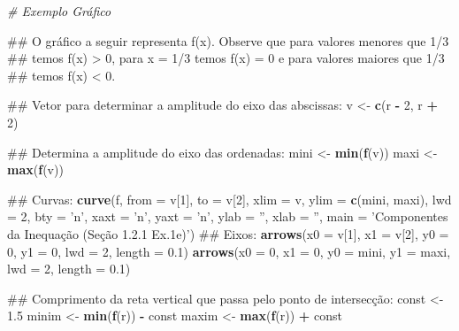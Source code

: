 \documentclass[]{book}
\newenvironment{Shaded}{\begin{snugshade}}{\end{snugshade}}
\newcommand{\KeywordTok}[1]{\textcolor[rgb]{0.13,0.29,0.53}{\textbf{#1}}}
\newcommand{\DataTypeTok}[1]{\textcolor[rgb]{0.13,0.29,0.53}{#1}}
\newcommand{\DecValTok}[1]{\textcolor[rgb]{0.00,0.00,0.81}{#1}}
\newcommand{\FloatTok}[1]{\textcolor[rgb]{0.00,0.00,0.81}{#1}}
\newcommand{\StringTok}[1]{\textcolor[rgb]{0.31,0.60,0.02}{#1}}
\newcommand{\CommentTok}[1]{\textcolor[rgb]{0.56,0.35,0.01}{\textit{#1}}}
\newcommand{\OperatorTok}[1]{\textcolor[rgb]{0.81,0.36,0.00}{\textbf{#1}}}
\newcommand{\NormalTok}[1]{#1}
\begin{document}
\begin{enumerate}
\begin{Shaded}
\begin{Highlighting}[]
\CommentTok{# Exemplo Gráfico}

\NormalTok{##  O gráfico a seguir representa f(x). Observe que para valores menores que 1/3}
\NormalTok{## temos f(x) > 0, para x = 1/3 temos f(x) = 0 e para valores maiores que 1/3}
\NormalTok{## temos f(x) < 0.}

\NormalTok{##  Vetor para determinar a amplitude do eixo das abscissas:}
\NormalTok{v <-}\StringTok{ }\KeywordTok{c}\NormalTok{(r }\OperatorTok{-}\StringTok{ }\DecValTok{2}\NormalTok{, r }\OperatorTok{+}\StringTok{ }\DecValTok{2}\NormalTok{)}

\NormalTok{##  Determina  a amplitude do eixo das ordenadas:}
\NormalTok{mini <-}\StringTok{ }\KeywordTok{min}\NormalTok{(}\KeywordTok{f}\NormalTok{(v))}
\NormalTok{maxi <-}\StringTok{ }\KeywordTok{max}\NormalTok{(}\KeywordTok{f}\NormalTok{(v))}

\NormalTok{##  Curvas:}
\KeywordTok{curve}\NormalTok{(f, }\DataTypeTok{from =}\NormalTok{ v[}\DecValTok{1}\NormalTok{], }\DataTypeTok{to =}\NormalTok{ v[}\DecValTok{2}\NormalTok{], }\DataTypeTok{xlim =}\NormalTok{ v, }\DataTypeTok{ylim =} \KeywordTok{c}\NormalTok{(mini, maxi), }\DataTypeTok{lwd =} \DecValTok{2}\NormalTok{,}
  \DataTypeTok{bty =} \StringTok{'n'}\NormalTok{, }\DataTypeTok{xaxt =} \StringTok{'n'}\NormalTok{, }\DataTypeTok{yaxt =} \StringTok{'n'}\NormalTok{, }\DataTypeTok{ylab =} \StringTok{''}\NormalTok{, }\DataTypeTok{xlab =} \StringTok{''}\NormalTok{,}
  \DataTypeTok{main =} \StringTok{'Componentes da Inequação (Seção 1.2.1 Ex.1e)'}\NormalTok{)}
\NormalTok{##  Eixos:}
\KeywordTok{arrows}\NormalTok{(}\DataTypeTok{x0 =}\NormalTok{ v[}\DecValTok{1}\NormalTok{], }\DataTypeTok{x1 =}\NormalTok{ v[}\DecValTok{2}\NormalTok{],}
   \DataTypeTok{y0 =} \DecValTok{0}\NormalTok{, }\DataTypeTok{y1 =} \DecValTok{0}\NormalTok{, }\DataTypeTok{lwd =} \DecValTok{2}\NormalTok{, }\DataTypeTok{length =} \FloatTok{0.1}\NormalTok{)}
\KeywordTok{arrows}\NormalTok{(}\DataTypeTok{x0 =} \DecValTok{0}\NormalTok{, }\DataTypeTok{x1 =} \DecValTok{0}\NormalTok{,}
   \DataTypeTok{y0 =}\NormalTok{ mini, }\DataTypeTok{y1 =}\NormalTok{ maxi, }\DataTypeTok{lwd =} \DecValTok{2}\NormalTok{, }\DataTypeTok{length =} \FloatTok{0.1}\NormalTok{)}

\NormalTok{##  Comprimento da reta vertical que passa pelo ponto de intersecção:}
\NormalTok{const <-}\StringTok{ }\FloatTok{1.5}
\NormalTok{minim <-}\StringTok{ }\KeywordTok{min}\NormalTok{(}\KeywordTok{f}\NormalTok{(r)) }\OperatorTok{-}\StringTok{ }\NormalTok{const}
\NormalTok{maxim <-}\StringTok{ }\KeywordTok{max}\NormalTok{(}\KeywordTok{f}\NormalTok{(r)) }\OperatorTok{+}\StringTok{ }\NormalTok{const}


\end{Highlighting}
\end{Shaded}
\end{enumerate}
\end{document}
